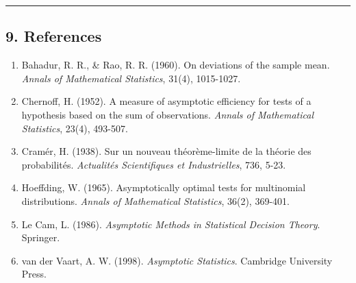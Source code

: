 \documentclass[
  12pt,
]{article}
\providecommand{\tightlist}{%
  \setlength{\itemsep}{0pt}\setlength{\parskip}{0pt}}
\begin{document}
\begin{center}\rule{0.5\linewidth}{0.5pt}\end{center}

\subsection{9. References}\label{references}

\begin{enumerate}
\def\labelenumi{\arabic{enumi}.}
\tightlist
\item
  Bahadur, R. R., \& Rao, R. R. (1960). On deviations of the sample mean. \emph{Annals of Mathematical Statistics}, 31(4), 1015-1027.
\item
  Chernoff, H. (1952). A measure of asymptotic efficiency for tests of a hypothesis based on the sum of observations. \emph{Annals of Mathematical Statistics}, 23(4), 493-507.
\item
  Cramér, H. (1938). Sur un nouveau théorème-limite de la théorie des probabilités. \emph{Actualités Scientifiques et Industrielles}, 736, 5-23.
\item
  Hoeffding, W. (1965). Asymptotically optimal tests for multinomial distributions. \emph{Annals of Mathematical Statistics}, 36(2), 369-401.
\item
  Le Cam, L. (1986). \emph{Asymptotic Methods in Statistical Decision Theory}. Springer.
\item
  van der Vaart, A. W. (1998). \emph{Asymptotic Statistics}. Cambridge University Press.
\end{enumerate}
\end{document}
